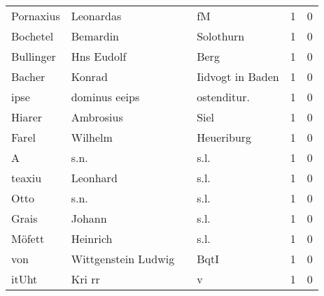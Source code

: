 \begin{center}
\begin{tiny}
\begin{longtabu}{llllrr}
                Pornaxius &                          Leonardas &             &                                          fM &          1 &         0 \\
                 Bochetel &                           Bemardin &             &                                   Solothurn &          1 &         0 \\
                Bullinger &                         Hns Eudolf &             &                                        Berg &          1 &         0 \\
                   Bacher &                             Konrad &             &                            Iidvogt in Baden &          1 &         0 \\
                     ipse &                      dominus eeips &             &                                ostenditur.  &          1 &         0 \\
                   Hiarer &                          Ambrosius &             &                                        Siel &          1 &         0 \\
                    Farel &                            Wilhelm &             &                                  Heueriburg &          1 &         0 \\
                        A &                               s.n. &             &                                        s.l. &          1 &         0 \\
                   teaxiu &                           Leonhard &             &                                        s.l. &          1 &         0 \\
                     Otto &                               s.n. &             &                                        s.l. &          1 &         0 \\
                    Grais &                             Johann &             &                                        s.l. &          1 &         0 \\
                   Möfett &                           Heinrich &             &                                        s.l. &          1 &         0 \\
                      von &                Wittgenstein Ludwig &             &                                        BqtI &          1 &         0 \\
                    itUht &                             Kri rr &             &                                           v &          1 &         0 \\

\end{longtabu}
\end{tiny}
\end{center}

